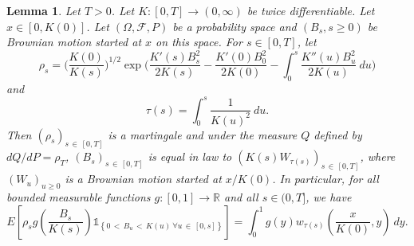 \documentclass[10pt]{amsart}
\newtheorem{lemm}[theo]{Lemma}\newtheorem{prop}[theo]{Proposition}\newtheorem{coro}[theo]{Corollary}\newtheorem{conj}[theo]{Conjecture}
\theoremstyle{definition}\newtheorem{defi}[theo]{Definition}\newtheorem{rema}[theo]{Remark}\newtheorem{exam}[theo]{Example}\newtheorem{exem}[theo]{Example}\newtheorem{nota}[theo]{Notation}
\newcommand\F{\mathcal{F}}
\newcommand*\R{\mathbb{R}}
\newcommand{\1} {\mathds{1}}
\let\oldforall\forall
\renewcommand*{\forall}{\mathrel{\oldforall}}
\begin{document}
\begin{lemm}\label{densityK}
Let $T > 0$. Let $K: [0, T] \rightarrow (0, \infty)$ be twice differentiable. Let $x\in [0,K(0)]$. Let $(\Omega, \F, P)$ be a probability space and $(B_s, s \geq 0)$ be Brownian motion started at $x$ on this space. For $s \in [0, T]$, let
\begin{equation}\label{rhodef}
\rho_s = \bigg(\frac{K(0)}{K(s)} \bigg)^{1/2} \exp \bigg(\frac{K'(s) B_s^2}{2K(s)} - \frac{K'(0)B_0^2}{2K(0)} - \int_0^s \frac{K''(u)B_u^2}{2K(u)} \: du \bigg)
\end{equation}
and
\begin{equation}\label{taudef}
\tau(s) = \int_0^s \frac{1}{K(u)^2} \: du.
\end{equation}
Then $(\rho_s)_{s\,\in\,[0,T]}$ is a martingale and under the measure $Q$ defined by $dQ/dP = \rho_T$, $(B_s)_{s\,\in\,[0,T]}$ is equal in law to $(K(s) W_{\tau(s)})_{s\,\in\,[0,T]}$, where $(W_u)_{u\ge0}$ is a Brownian motion started at $x/K(0)$. In particular, for all bounded measurable functions $g: [0, 1] \rightarrow \R$ and all $s \in (0, T]$, we have
\[
E \left[\rho_s g \left(\frac{B_s}{K(s)} \right) \1_{\left\{0\,<\,B_u\,<\,K(u) \: \forall u\,\in\,[0, s]\right\}} \right] = \int_0^1 g(y) w_{\tau(s)}\left(\frac x {K(0)}, y\right) \: dy.
\]
\end{lemm}
\end{document}
